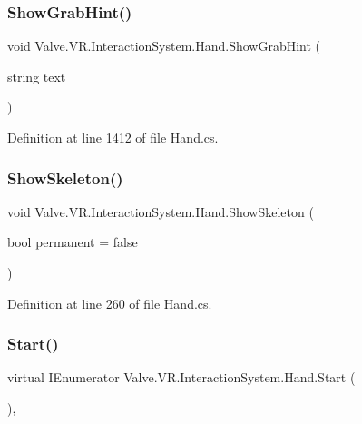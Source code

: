 \subsubsection{\texorpdfstring{ShowGrabHint()}{ShowGrabHint()}\hspace{0.1cm}{\footnotesize\ttfamily [2/2]}}
{\footnotesize\ttfamily void Valve.\+V\+R.\+Interaction\+System.\+Hand.\+Show\+Grab\+Hint (\begin{DoxyParamCaption}\item[{string}]{text }\end{DoxyParamCaption})}



Definition at line 1412 of file Hand.\+cs.

\mbox{\label{class_valve_1_1_v_r_1_1_interaction_system_1_1_hand_aadca63a28b7a68eba58631525b8e1296}} 
\subsubsection{\texorpdfstring{ShowSkeleton()}{ShowSkeleton()}}
{\footnotesize\ttfamily void Valve.\+V\+R.\+Interaction\+System.\+Hand.\+Show\+Skeleton (\begin{DoxyParamCaption}\item[{bool}]{permanent = {\ttfamily false} }\end{DoxyParamCaption})}



Definition at line 260 of file Hand.\+cs.

\mbox{\label{class_valve_1_1_v_r_1_1_interaction_system_1_1_hand_ab033ec68d0f24fd69df60110e1b5296b}} 
\subsubsection{\texorpdfstring{Start()}{Start()}}
{\footnotesize\ttfamily virtual I\+Enumerator Valve.\+V\+R.\+Interaction\+System.\+Hand.\+Start (\begin{DoxyParamCaption}{ }\end{DoxyParamCaption})\hspace{0.3cm}{\ttfamily [protected]}, {\ttfamily [virtual]}}



